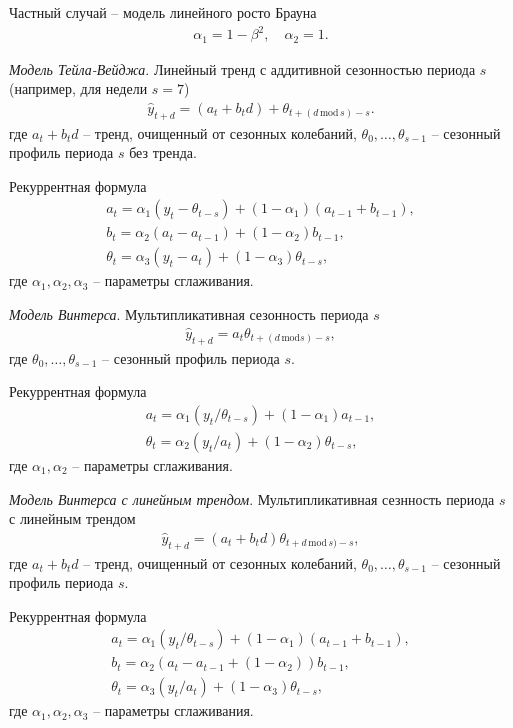 \documentclass[%
	11pt,
	a4paper,
	utf8,
		]{article}
\begin{document}
Частный случай -- модель линейного росто Брауна
\begin{align*}
	\alpha_1 = 1 - \beta^2, \quad \alpha_2 = 1.
\end{align*}

\emph{Модель Тейла-Вейджа}. Линейный тренд с аддитивной сезонностью периода $ s $ (например, для недели $ s = 7 $)
\begin{align*}
	\hat{y}_{t + d} = (a_t + b_t d) + \theta_{t + (d \, \text{mod} \, s) - s }.
\end{align*}
где $ a_t + b_t d $ -- тренд, очищенный от сезонных колебаний, $ \theta_0, \ldots, \theta_{s - 1} $ -- сезонный профиль периода $ s $ без тренда.

Рекуррентная формула
\begin{align*}
	a_t = \alpha_1 (y_t - \theta_{t - s}) + (1 - \alpha_1)(a_{t - 1} + b_{t - 1}),\\
	b_t = \alpha_2 (a_t - a_{t - 1}) + (1 - \alpha_2) b_{t - 1}, \\
	\theta_t = \alpha_3 (y_t - a_t) + (1 - \alpha_3) \theta_{t - s},
\end{align*}
где $ \alpha_1, \alpha_2, \alpha_3 $ -- параметры сглаживания.

\emph{Модель Винтерса}. Мультипликативная сезонность периода $ s $
\begin{align*}
	\hat{y}_{t + d} = a_t \theta_{t + (d \, \text{mod} s) - s},
\end{align*}
где $ \theta_0, \ldots, \theta_{s - 1} $ -- сезонный профиль периода $ s $.

Рекуррентная формула
\begin{align*}
	a_t = \alpha_1 (y_t / \theta_{t - s}) + (1 - \alpha_1) a_{t - 1},\\
	\theta_t = \alpha_2 (y_t / a_t) + (1 - \alpha_2) \theta_{ t - s},
\end{align*}
где $ \alpha_1, \alpha_2 $ -- параметры сглаживания.

\emph{Модель Винтерса с линейным трендом}. Мультипликативная сезнность периода $ s $ с линейным трендом
\begin{align*}
	\hat{y}_{t + d} = (a_t + b_t d) \theta_{t + d \, \text{mod} \, s) - s},
\end{align*} 
где $ a_t +b_t d $ -- тренд, очищенный от сезонных колебаний, $ \theta_0, \ldots, \theta_{s - 1} $ -- сезонный профиль периода $ s $.

Рекуррентная формула
\begin{align*}
	a_t = \alpha_1 (y_t / \theta_{t - s}) + (1 - \alpha_1)(a_{t - 1} + b_{t - 1}),\\
	b_t = \alpha_2 (a_t - a_{t - 1} + (1 - \alpha_2)) b_{t - 1}, \\
	\theta_t = \alpha_3 (y_t / a_t) + (1 - \alpha_3) \theta_{t - s},
\end{align*}
где $ \alpha_1, \alpha_2, \alpha_3 $ -- параметры сглаживания.
\end{document}
